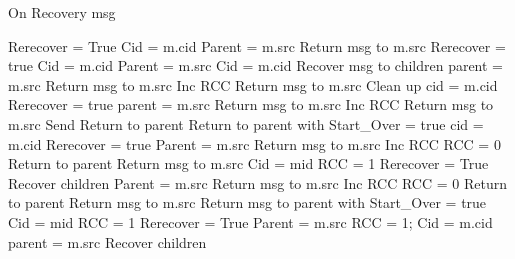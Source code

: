 \documentclass{article}
\begin{document}
\begin{algorithm}
\caption{On Recovery msg}
\label{Recovery message received}
\begin{algorithmic}[1]
		\State Rerecover = True
		\State Cid = m.cid
		\State Parent = m.src
	\Else
		\State Return msg to m.src
		\State Rerecover = true
		\State Cid = m.cid
		\State Parent = m.src
	\EndIf
{}
	\State Cid = m.cid
	\State Recover msg to children
	\State parent = m.src
			\State Return msg to m.src
			\State Inc RCC
			\State Return msg to m.src
				\State Clean up
			\EndIf
		\Else
			\State cid = m.cid
			\State Rerecover = true
			\State parent = m.src
		\EndIf
	\Else
			\State Return msg to m.src
			\State Inc RCC
			\State Return msg to m.src
				\State Send Return to parent
			\EndIf
		\Else
			\State Return to parent with Start\_Over = true
			\State cid = m.cid
			\State Rerecover = true
			\State Parent = m.src
		\EndIf
	\EndIf
{}
			\State Return msg to m.src
			\State Inc RCC
				\State RCC = 0
				\State Return to parent
			\EndIf
			\State Return msg to m.src
		\Else
			\State Cid = mid
			\State RCC = 1
				\State Rerecover = True	
			\Else 
				\State Recover children
			\EndIf
			\State Parent = m.src
		\EndIf
	\Else
			\State Return msg to m.src
			\State Inc RCC
				\State RCC = 0
				\State Return to parent
			\EndIf
			\State Return msg to m.src
		\Else
			\State Return msg to parent with Start\_Over = true
			\State Cid = mid
			\State RCC = 1
			\State Rerecover = True
			\State Parent = m.src
		\EndIf
	\EndIf
{}
	\State RCC = 1;
	\State Cid = m.cid
	\State parent = m.src
	\State Recover children
\EndIf
\EndProcedure
\end{algorithmic}
\end{algorithm}	
\end{document}
